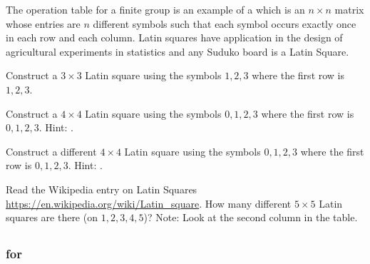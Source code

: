 \begin{exer}[\exerE] %
\label{exer_latin_squares}
    The operation table for a finite group is an example of a  which is an $n \times n$ matrix whose entries are $n$ different symbols such that each symbol occurs exactly once in each row and each column.  Latin squares have application in the design of agricultural experiments in statistics and any Suduko board is a Latin Square.
        \begin{exerpart}
            \item Construct a $3 \times 3$ Latin square using the symbols $1, 2, 3$ where the first row is $1, 2, 3$.
            \item Construct a $4 \times 4$ Latin square using the symbols $0, 1, 2, 3$ where the first row is $0, 1, 2, 3$. Hint: .
            \item Construct a different $4 \times 4$ Latin square using the symbols $0, 1, 2, 3$ where the first row is $0, 1, 2, 3$. Hint: .
            \item Read the Wikipedia entry on Latin Squares \url{https://en.wikipedia.org/wiki/Latin_square}.  How many different $5\times 5$ Latin squares are there (on $1,2,3,4,5$)? Note: Look at the second column in the table. %
        \end{exerpart}
\end{exer}

\subsection{\answers}

\subsubsection{\answers for 
 \submatpowers}

